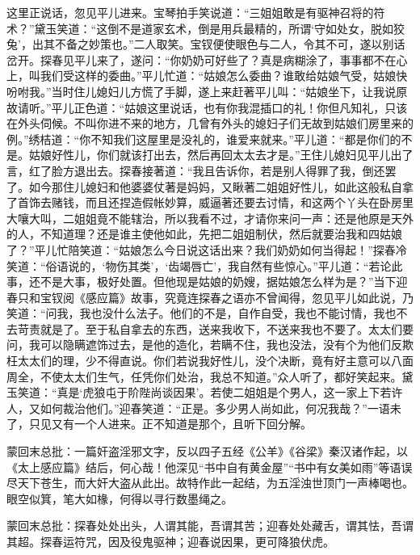\begin{parag}
    这里正说话，忽见平儿进来。宝琴拍手笑说道：“三姐姐敢是有驱神召将的符术？”黛玉笑道：“这倒不是道家玄术，倒是用兵最精的，所谓‘守如处女，脱如狡兔’，出其不备之妙策也。”二人取笑。宝钗便使眼色与二人，令其不可，遂以别话岔开。探春见平儿来了，遂问：“你奶奶可好些了？真是病糊涂了，事事都不在心上，叫我们受这样的委曲。”平儿忙道：“姑娘怎么委曲？谁敢给姑娘气受，姑娘快吩咐我。”当时住儿媳妇儿方慌了手脚，遂上来赶著平儿叫：“姑娘坐下，让我说原故请听。”平儿正色道：“姑娘这里说话，也有你我混插口的礼！你但凡知礼，只该在外头伺候。不叫你进不来的地方，几曾有外头的媳妇子们无故到姑娘们房里来的例。”绣桔道：“你不知我们这屋里是没礼的，谁爱来就来。”平儿道：“都是你们的不是。姑娘好性儿，你们就该打出去，然后再回太太去才是。”王住儿媳妇见平儿出了言，红了脸方退出去。探春接著道：“我且告诉你，若是别人得罪了我，倒还罢了。如今那住儿媳妇和他婆婆仗著是妈妈，又瞅著二姐姐好性儿，如此这般私自拿了首饰去赌钱，而且还捏造假帐妙算，威逼著还要去讨情，和这两个丫头在卧房里大嚷大叫，二姐姐竟不能辖治，所以我看不过，才请你来问一声：还是他原是天外的人，不知道理？还是谁主使他如此，先把二姐姐制伏，然后就要治我和四姑娘了？”平儿忙陪笑道：“姑娘怎么今日说这话出来？我们奶奶如何当得起！”探春冷笑道：“俗语说的，‘物伤其类’，‘齿竭唇亡’，我自然有些惊心。”平儿道：“若论此事，还不是大事，极好处置。但他现是姑娘的奶嫂，据姑娘怎么样为是？”当下迎春只和宝钗阅《感应篇》故事，究竟连探春之语亦不曾闻得，忽见平儿如此说，乃笑道：“问我，我也没什么法子。他们的不是，自作自受，我也不能讨情，我也不去苛责就是了。至于私自拿去的东西，送来我收下，不送来我也不要了。太太们要问，我可以隐瞒遮饰过去，是他的造化，若瞒不住，我也没法，没有个为他们反欺枉太太们的理，少不得直说。你们若说我好性儿，没个决断，竟有好主意可以八面周全，不使太太们生气，任凭你们处治，我总不知道。”众人听了，都好笑起来。黛玉笑道：“真是‘虎狼屯于阶陛尚谈因果’。若使二姐姐是个男人，这一家上下若许人，又如何裁治他们。”迎春笑道：“正是。多少男人尚如此，何况我哉？”一语未了，只见又有一个人进来。正不知道是那个，且听下回分解。
\end{parag}


\begin{parag}
    \begin{note}蒙回末总批：一篇奸盗淫邪文字，反以四子五经《公羊》《谷梁》秦汉诸作起，以《太上感应篇》结后，何心哉！他深见“书中自有黄金屋”“书中有女美如雨”等语误尽天下苍生，而大奸大盗从此出。故特作此一起结，为五淫浊世顶门一声棒喝也。眼空似箕，笔大如椽，何得以寻行数墨绳之。\end{note}
\end{parag}


\begin{parag}
    \begin{note}蒙回末总批：探春处处出头，人谓其能，吾谓其苦；迎春处处藏舌，谓其怯，吾谓其超。探春运符咒，因及役鬼驱神；迎春说因果，更可降狼伏虎。\end{note}
\end{parag}
